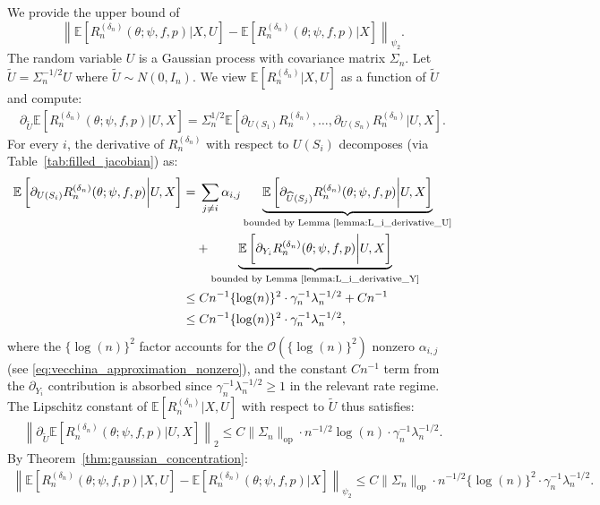 \documentclass[12pt]{article}
\newcommand{\E}{\mathbb{E}}
\begin{document}
\noindent We provide the upper bound of
$$\left\|\E\left[R_n^{(\delta_n)}(\theta;\psi,f,p)|X,U\right]-\E\left[R_n^{(\delta_n)}(\theta;\psi,f,p)|X\right]\right\|_{\psi_2}.$$
The random variable $U$ is a Gaussian process with covariance matrix $\Sigma_n$. Let $\widetilde U=\Sigma_n^{-1/2}U$ where $\widetilde U\sim N(0,I_n)$. We view $\E[R_n^{(\delta_n)}|X,U]$ as a function of $\widetilde U$ and compute:
\begin{align*}
\partial_{\widetilde U}\E\left[R_n^{(\delta_n)}(\theta;\psi,f,p)\bigg|U,X\right]
= \Sigma_n^{1/2}\E\left[\partial_{U(S_1)}R_n^{(\delta_n)},\ldots,\partial_{U(S_n)}R_n^{(\delta_n)}\bigg|U,X\right].
\end{align*}
For every $i$, the derivative of $R_n^{(\delta_n)}$ with respect to $U(S_i)$ decomposes (via Table~\ref{tab:filled_jacobian}) as:
\begin{align*}
\E\left[\partial_{U(S_i)}R_n^{(\delta_n)}(\theta;\psi,f,p)\bigg|U,X\right]
=&\;\sum_{j\neq i}\alpha_{i,j}\underbrace{\E\left[\partial_{\widehat U(S_j)}R_n^{(\delta_n)}(\theta;\psi,f,p)\bigg|U,X\right]}_{\text{bounded by Lemma~\ref{lemma:L_i_derivative_U}}}\\
&+\underbrace{\E\left[\partial_{Y_i}R_n^{(\delta_n)}(\theta;\psi,f,p)\bigg|U,X\right]}_{\text{bounded by Lemma~\ref{lemma:L_i_derivative_Y}}}\\
\leq &\; Cn^{-1}\{\log(n)\}^2\cdot\gamma_n^{-1}\lambda_n^{-1/2} + Cn^{-1}\\
\leq &\; Cn^{-1}\{\log(n)\}^2\cdot\gamma_n^{-1}\lambda_n^{-1/2},
\end{align*}
where the $\{\log(n)\}^2$ factor accounts for the $\mathcal{O}(\{\log(n)\}^2)$ nonzero $\alpha_{i,j}$ (see \eqref{eq:vecchina_approximation_nonzero}), and the constant $Cn^{-1}$ term from the $\partial_{Y_i}$ contribution is absorbed since $\gamma_n^{-1}\lambda_n^{-1/2}\geq 1$ in the relevant rate regime. The Lipschitz constant of $\E[R_n^{(\delta_n)}|X,U]$ with respect to $\widetilde U$ thus satisfies:
\begin{align*}
\left\|\partial_{\widetilde U}\E\left[R_n^{(\delta_n)}(\theta;\psi,f,p)\bigg|U,X\right]\right\|_2
\leq C\|\Sigma_n\|_{\mathrm{op}}\cdot n^{-1/2}\log(n)\cdot\gamma_n^{-1}\lambda_n^{-1/2}.
\end{align*}
By Theorem~\ref{thm:gaussian_concentration}:
\begin{align*}
\left\|\E\left[R_n^{(\delta_n)}(\theta;\psi,f,p)|X,U\right]-\E\left[R_n^{(\delta_n)}(\theta;\psi,f,p)|X\right]\right\|_{\psi_2}
\leq C\|\Sigma_n\|_{\mathrm{op}}\cdot n^{-1/2}\{\log(n)\}^2\cdot\gamma_n^{-1}\lambda_n^{-1/2}.
\end{align*}
\end{document}
